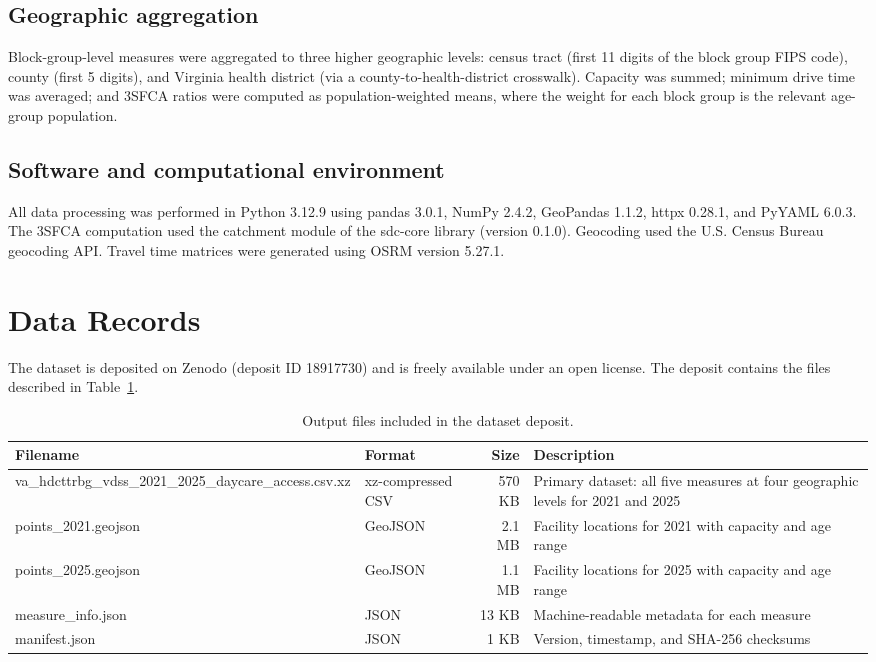 \documentclass{CUP-JNL-DAP}%
\begin{document}
\subsection{Geographic aggregation}

Block-group-level measures were aggregated to three higher geographic levels: census tract (first 11 digits of the block group FIPS code), county (first 5 digits), and Virginia health district (via a county-to-health-district crosswalk\citep{vdh2020}). Capacity was summed; minimum drive time was averaged; and 3SFCA ratios were computed as population-weighted means, where the weight for each block group is the relevant age-group population.

\subsection{Software and computational environment}

All data processing was performed in Python 3.12.9 using pandas 3.0.1, NumPy 2.4.2, GeoPandas 1.1.2, httpx 0.28.1, and PyYAML 6.0.3. The 3SFCA computation used the catchment module of the sdc-core library (version 0.1.0)\citep{sdccore}. Geocoding used the U.S. Census Bureau geocoding API\citep{census_geocoder}. Travel time matrices were generated using OSRM version 5.27.1\citep{luxen2011}.


\section{Data Records}

The dataset is deposited on Zenodo (deposit ID 18917730)\citep{zenodo_dataset} and is freely available under an open license. The deposit contains the files described in Table~\ref{tab:files}.

\begin{table}[ht]
\centering
\caption{Output files included in the dataset deposit.}
\label{tab:files}
\small
\begin{tabularx}{\textwidth}{llrX}
\toprule
Filename & Format & Size & Description \\
\midrule
va\_hdcttrbg\_vdss\_2021\_2025\_daycare\_access.csv.xz & xz-compressed CSV & 570 KB & Primary dataset: all five measures at four geographic levels for 2021 and 2025 \\
points\_2021.geojson & GeoJSON & 2.1 MB & Facility locations for 2021 with capacity and age range \\
points\_2025.geojson & GeoJSON & 1.1 MB & Facility locations for 2025 with capacity and age range \\
measure\_info.json & JSON & 13 KB & Machine-readable metadata for each measure \\
manifest.json & JSON & 1 KB & Version, timestamp, and SHA-256 checksums \\
\bottomrule
\end{tabularx}
\end{table}
\end{document}
